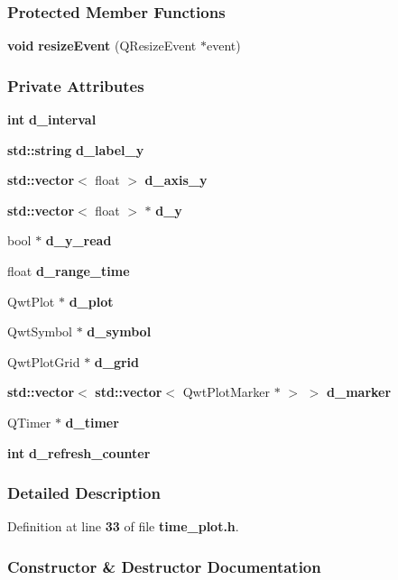 \subsubsection*{Protected Member Functions}
\begin{DoxyCompactItemize}
\item 
{\bf void} {\bf resize\+Event} (Q\+Resize\+Event $\ast$event)
\end{DoxyCompactItemize}
\subsubsection*{Private Attributes}
\begin{DoxyCompactItemize}
\item 
{\bf int} {\bf d\+\_\+interval}
\item 
{\bf std\+::string} {\bf d\+\_\+label\+\_\+y}
\item 
{\bf std\+::vector}$<$ float $>$ {\bf d\+\_\+axis\+\_\+y}
\item 
{\bf std\+::vector}$<$ float $>$ $\ast$ {\bf d\+\_\+y}
\item 
bool $\ast$ {\bf d\+\_\+y\+\_\+read}
\item 
float {\bf d\+\_\+range\+\_\+time}
\item 
Qwt\+Plot $\ast$ {\bf d\+\_\+plot}
\item 
Qwt\+Symbol $\ast$ {\bf d\+\_\+symbol}
\item 
Qwt\+Plot\+Grid $\ast$ {\bf d\+\_\+grid}
\item 
{\bf std\+::vector}$<$ {\bf std\+::vector}$<$ Qwt\+Plot\+Marker $\ast$ $>$ $>$ {\bf d\+\_\+marker}
\item 
Q\+Timer $\ast$ {\bf d\+\_\+timer}
\item 
{\bf int} {\bf d\+\_\+refresh\+\_\+counter}
\end{DoxyCompactItemize}


\subsubsection{Detailed Description}


Definition at line {\bf 33} of file {\bf time\+\_\+plot.\+h}.



\subsubsection{Constructor \& Destructor Documentation}
